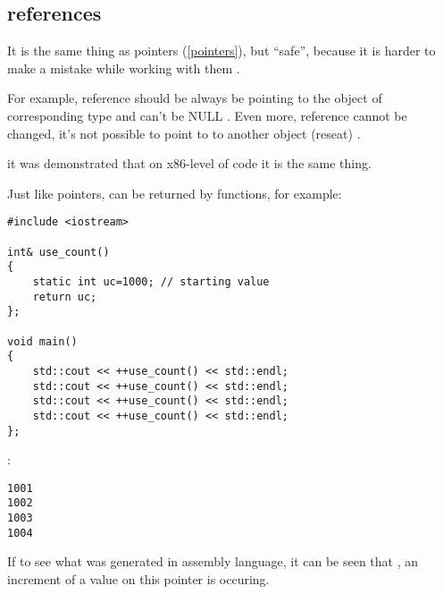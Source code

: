 ﻿\subsection{references}

{It is the same thing as pointers (\ref{pointers}), but ``safe'', 
because it is harder to make a mistake while working with them}
\cite[8.3.2]{CPP11}.

{For example, reference should be always be pointing to the object of corresponding type and can't be NULL}
\cite[8.6]{ParashiftCPPFAQ}.
{Even more, reference cannot be changed, it's not possible to point to to another object (reseat)}
\cite[8.5]{ParashiftCPPFAQ}.

 \cite[1.7.1]{REBook} 
{it was demonstrated that on x86-level of code it is the same thing}.

{Just like pointers,  can be returned by functions, for example}:

\begin{lstlisting}
#include <iostream>
 
int& use_count()
{
	static int uc=1000; // starting value
	return uc;
};
 
void main()
{
	std::cout << ++use_count() << std::endl;
	std::cout << ++use_count() << std::endl;
	std::cout << ++use_count() << std::endl;
	std::cout << ++use_count() << std::endl;
};
\end{lstlisting}

:

\begin{lstlisting}
1001
1002
1003
1004
\end{lstlisting}

{If to see what was generated in assembly language, it can be seen that}  
 , 
  
{an increment of a value on this pointer is occuring}.

